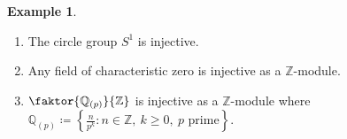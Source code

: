\documentclass[10pt,letterpaper,cm]{nupset}
\theoremstyle{definition}
\newtheorem{exmp}[definition]{Example}
\theoremstyle{theorem}
\newtheorem{corollary}[definition]{Corollary}
\theoremstyle{remark}
\newcommand{\Q}{\mathbb Q}
\newcommand{\Z}{\mathbb Z}
\newcommand{\1}{\mathbf{1}}
\newcommand{\0}{\vec 0}
\begin{document}
\begin{exmp}
\begin{enumerate}
\begin{proof}
For each $\tilde{a} \in \tilde{A}$, write $\tilde{a} = a + mx$ for some $a\in A$ and some $m\in \Z$. Let $$\tilde{\xi}(\tilde{a}) = \xi(a) + m\tilde{\xi}(x).$$
We claim that $\tilde{\xi}$ is well-defined. If $\left\{n \in \Z : nx \in A\right\} =\left(0\right)$, then $\tilde{\xi}(x) =0$ and $\tilde{\xi}(\tilde{a}) = \xi(a)$, where $a$ is uniquely determined from $\tilde{a}$.  If $\left\{n \in \Z : nx \in A\right\} = \left(n_0\right)$, then $\tilde{\xi}(\tilde{a}) = \xi(a) + \frac{m\xi(n_0x)}{n_0}$. If $\tilde{a} = b + kx$, then $a-b = \left(k-m\right)x $. If this equals $0$, then we're done.
Otherwise, $k-m = dn_0$ for some integer $d\ne 0$.  Then 
\begin{align*} 
 0 & = \xi(a-b) - \xi((k-m)x) = \xi(a) - \xi(b) - \xi(dn_0x) 
\\ & =  \xi(a) - \xi(b) - \tilde{\xi}(dn_0x) =  \xi(a) - \xi(b) -dn_0 \tilde{\xi}(x)
\\ & =  \xi(a) - \xi(b) -(k-m) \tilde{\xi}(x) = \xi(a) - \xi(b) +\frac{m-k}{n_0}\xi(n_0x)
\\ & = \tilde{\xi}(a+mx) - \tilde{\xi}(b+kx).
\end{align*}
This confirms that $\tilde{\xi}$ is well-defined. Thus,
we have shown that $\left(\tilde{A}, \tilde{\xi}\right) > \left(A, \xi\right)$, a contradiction. 
\end{proof}
\begin{corollary}
Any divisible abelian group is injective.
\end{corollary}
\item The circle group $S^1$ is injective.
\item Any field of characteristic zero is injective as a $\Z$-module. 
\item $\faktor{\Q_{(p)}}{\Z}$ is injective as a $\Z$-module where $\Q_{(p)} \coloneqq  \left\{\frac{n}{p^k} : n \in \Z, \ k\geq 0,  \ p \text{ prime}  \right\}$.
\end{enumerate}
\end{exmp}
\end{document}
